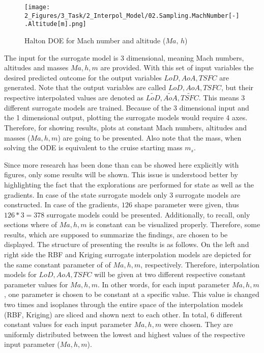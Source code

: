 \begin{figure}
    \centering
    \texttt{[image: 2\_Figures/3\_Task/2\_Interpol\_Model/02.Sampling.MachNumber[-].Altitude[m].png]}
    \caption{Halton DOE for Mach number and altitude ($Ma, \, h$)}
    \label{fig_57_Mach_H}    
\end{figure}

\FloatBarrier
The input for the surrogate model is 3 dimensional, 
meaning Mach numbers, altitudes and masses 
$Ma, h, m$ are provided. With this 
set of input variables the desired predicted 
outcome for the output variables $LoD, AoA, TSFC$
are generated. Note that the output
variables are called $LoD, AoA, TSFC$, but 
their respective interpolated 
values are denoted as $\tilde{LoD}, \tilde{AoA}, \tilde{TSFC}$.
This means 3 different surrogate 
models 
are trained. Because of the 3 dimensional input 
and the 1 dimensional output, plotting the 
surrogate models would require 4 axes. Therefore, for 
showing  results, plots at constant
Mach numbers, altitudes and masses ($Ma, h, m$)
are going to be presented. Also note that the mass, when 
solving the ODE is equivalent to the cruise 
starting mass $m_s$. \newline

Since more research has been done than can 
be showed here explicitly with figures, only 
some results will be shown. This issue is understood 
better by highlighting the fact that the 
explorations are performed for state as  
well as the gradients. In case of the 
state surrogate models only 3 surrogate models are 
constructed. In case of the gradients,
$126$ shape parameter were given, thus 
$126*3 = 378$ surrogate models could be presented.
Additionally, to recall, only sections where 
of $Ma, h, m$ is constant can be visualized 
properly. Therefore, some 
results, which 
are supposed to summarize the findings, are chosen
to be displayed. The structure of presenting the results 
is as follows. On the left and right side the RBF and 
Kriging surrogate interpolation models are depicted 
for the same constant parameter of of $Ma, h, m$, respectively.
Therefore, interpolation models for $LoD, AoA, TSFC$
will be 
given at two different respective constant 
parameter values for $Ma, h, m$. In other words, 
for each input parameter $Ma, h, m$, 
one parameter is chosen to be constant 
at a specific value. This value is changed 
two times and isoplanes through 
the entire space of the 
interpolation models (RBF, Kriging) are sliced and shown 
next to each other. In total, 6 different constant 
values for each input parameter $Ma, h, m$ were
chosen. They are uniformly distributed between 
the lowest and highest values of the respective 
input parameter ($Ma, h, m$).\newline


